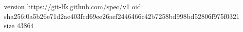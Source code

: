 version https://git-lfs.github.com/spec/v1
oid sha256:0a5b26e71d2ae403fcd69ee26aef2446466c42b7258bd998bd52806f975f0321
size 43864
